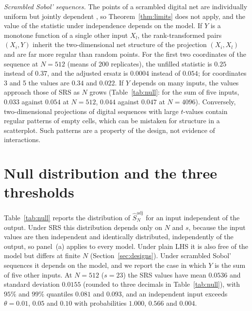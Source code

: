 \documentclass[11pt,a4paper]{article}
\theoremstyle{definition}
\theoremstyle{remark}
\newcommand{\Sadj}{\hat S^{\mathrm{adj}}_N}
\begin{document}
\emph{Scrambled Sobol' sequences.} The points of a scrambled digital net are individually uniform but jointly dependent \citep{owen1997,dick2010}, so Theorem~\ref{thm:limits} does not apply, and the value of the statistic under independence depends on the model. If $Y$ is a monotone function of a single other input $X_l$, the rank-transformed pairs $(X_i,Y)$ inherit the two-dimensional net structure of the projection $(X_i,X_l)$ and are far more regular than random points. For the first two coordinates of the sequence at $N=512$ (means of 200 replicates), the unfilled statistic is $0.25$ instead of $0.37$, and the adjusted ersatz is $0.0004$ instead of $0.054$; for coordinates 3 and 5 the values are $0.34$ and $0.022$. If $Y$ depends on many inputs, the values approach those of SRS as $N$ grows (Table~\ref{tab:null}: for the sum of five inputs, $0.033$ against $0.054$ at $N=512$, $0.044$ against $0.047$ at $N=4096$). Conversely, two-dimensional projections of digital sequences with large $t$-values contain regular patterns of empty cells, which can be mistaken for structure in a scatterplot. Such patterns are a property of the design, not evidence of interactions.

\section{Null distribution and the three thresholds}\label{sec:null}

Table~\ref{tab:null} reports the distribution of $\Sadj$ for an input independent of the output. Under SRS this distribution depends only on $N$ and $s$, because the input values are then independent and identically distributed, independently of the output, so panel~(a) applies to every model. Under plain LHS it is also free of the model but differs at finite $N$ (Section~\ref{sec:designs}). Under scrambled Sobol' sequences it depends on the model, and we report the case in which $Y$ is the sum of five other inputs. At $N=512$ ($s=23$) the SRS values have mean $0.0536$ and standard deviation $0.0155$ (rounded to three decimals in Table~\ref{tab:null}), with $95\%$ and $99\%$ quantiles $0.081$ and $0.093$, and an independent input exceeds $\theta=0.01$, $0.05$ and $0.10$ with probabilities $1.000$, $0.566$ and $0.004$.
\end{document}
